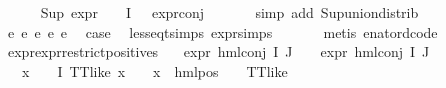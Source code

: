 \begin{isabellebody}
\ \ \ \ \isamarkupfalse%
\ {\isacartoucheopen}Sup\ {\isacharparenleft}{\kern0pt}{\isacharparenleft}{\kern0pt}expr{\isacharunderscore}{\kern0pt}{}\ {\isasymcirc}\ {\isasymPhi}{\isacharparenright}{\kern0pt}\ {\isacharbackquote}{\kern0pt}\ I{\isacharparenright}{\kern0pt}\ {\isasymle}\ {}{\isacartoucheclose}\ expr{\isacharunderscore}{\kern0pt}{}{\isacharunderscore}{\kern0pt}conj\ \isanewline
\ \ \ \ \isamarkupfalse%
\ {\isacharparenleft}{\kern0pt}simp\ add{\isacharcolon}{\kern0pt}\ Sup{\isacharunderscore}{\kern0pt}union{\isacharunderscore}{\kern0pt}distrib{\isacharparenright}{\kern0pt}\isanewline
\ \ \isamarkupfalse%
\ e{}\ e{}\ e{}\ e{}\ e{}\ \isamarkupfalse%
\ {\isacharquery}{\kern0pt}case\ \isamarkupfalse%
\ less{\isacharunderscore}{\kern0pt}eq{\isacharunderscore}{\kern0pt}t{\isachardot}{\kern0pt}simps\ expr{\isachardot}{\kern0pt}simps\ \isanewline
\ \ \ \ \isamarkupfalse%
\ {\isacharparenleft}{\kern0pt}metis\ enat{\isacharunderscore}{\kern0pt}ord{\isacharunderscore}{\kern0pt}code{\isacharparenleft}{\kern0pt}{}{\isacharparenright}{\kern0pt}{\isacharparenright}{\kern0pt}\isanewline
{}\isamarkupfalse%
%
\endisatagproof
{\isafoldproof}%
%
\isadelimproof
\isanewline
%
\endisadelimproof
\isanewline
{}\isamarkupfalse%
\ expr{\isacharunderscore}{\kern0pt}{}{\isacharunderscore}{\kern0pt}expr{\isacharunderscore}{\kern0pt}{}{\isacharunderscore}{\kern0pt}restrict{\isacharunderscore}{\kern0pt}positives{\isacharcolon}{\kern0pt}\isanewline
\ \ \ {\isachardoublequoteopen}{\isacharparenleft}{\kern0pt}expr{\isacharunderscore}{\kern0pt}{}\ {\isacharparenleft}{\kern0pt}hml{\isacharunderscore}{\kern0pt}conj\ I\ J\ {\isasymPhi}{\isacharparenright}{\kern0pt}{\isacharparenright}{\kern0pt}\ {\isasymle}\ {}{\isachardoublequoteclose}\ {\isachardoublequoteopen}{\isacharparenleft}{\kern0pt}expr{\isacharunderscore}{\kern0pt}{}\ {\isacharparenleft}{\kern0pt}hml{\isacharunderscore}{\kern0pt}conj\ I\ J\ {\isasymPhi}{\isacharparenright}{\kern0pt}{\isacharparenright}{\kern0pt}\ {\isasymle}\ {}{\isachardoublequoteclose}\isanewline
\ \ \ {\isachardoublequoteopen}{\isacharparenleft}{\kern0pt}{\isasymforall}x\ {\isasymin}\ {\isacharparenleft}{\kern0pt}{\isasymPhi}\ {\isacharbackquote}{\kern0pt}\ I{\isacharparenright}{\kern0pt}{\isachardot}{\kern0pt}\ TT{\isacharunderscore}{\kern0pt}like\ x\ {\isasymor}\ {\isacharparenleft}{\kern0pt}{\isasymexists}{\isasymalpha}\ {\isasymchi}{\isachardot}{\kern0pt}\ x\ {\isacharequal}{\kern0pt}\ hml{\isacharunderscore}{\kern0pt}pos\ {\isasymalpha}\ {\isasymchi}\ {\isasymand}\ TT{\isacharunderscore}{\kern0pt}like\ {\isasymchi}{\isacharparenright}{\kern0pt}{\isacharparenright}{\kern0pt}{\isachardoublequoteclose}\isanewline

\end{isabellebody}
